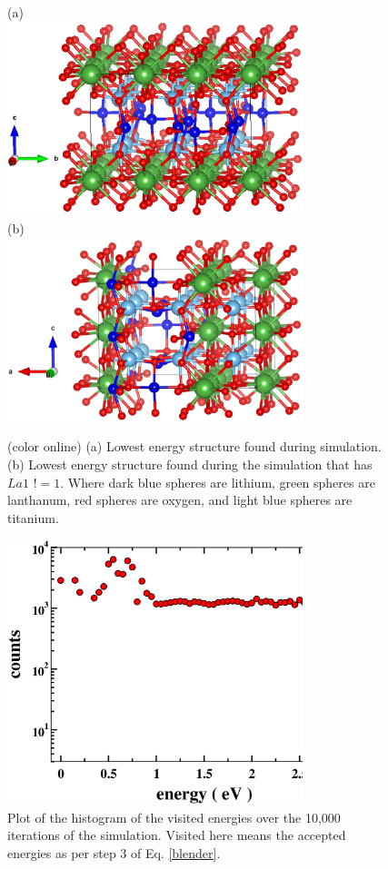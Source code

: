 \documentclass[aps,pre,reprint,superscriptaddress,showkeys]{revtex4-2}
\begin{document}
\begin{figure}
(a)\\
\includegraphics[width=8.6cm]{fig10a.eps}\\
(b)\\
\includegraphics[width=8.6cm]{fig10b.eps}
\caption{(color online) (a) Lowest energy structure found during simulation. (b)  Lowest energy structure found during the simulation that has $La1$  $!= 1$. Where dark blue spheres are lithium, green spheres are lanthanum, red spheres are oxygen, and light blue spheres  are titanium. \label{lowen_structures}}
\end{figure}

\begin{figure}
\includegraphics[width=8.6cm]{fig11.eps}
\caption{Plot of the histogram of the visited energies over the 10,000 iterations of the simulation. Visited here means the accepted energies as per step 3 of Eq. \ref{blender}.\label{Htot}}
\end{figure}
\end{document}
